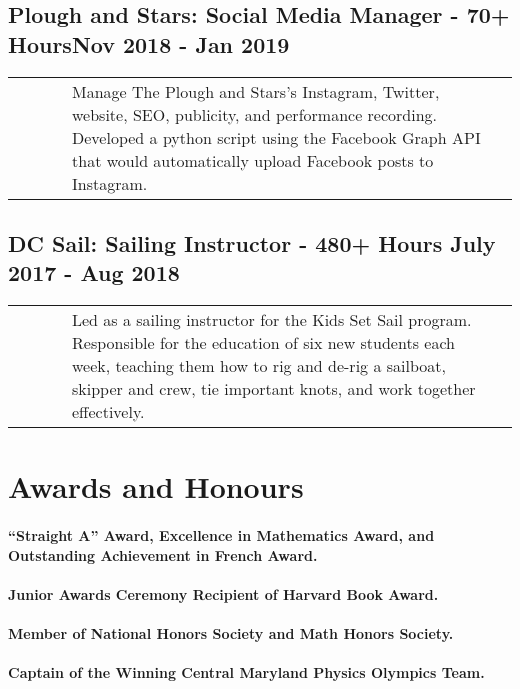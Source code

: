 \documentclass{article}
\begin{document}
\subsection{Plough and Stars: Social Media Manager - 70+ Hours\hfill Nov 2018 - Jan 2019\newline}

\begin{tabularx}{\linewidth}{ @{} l X r @{} }
\ \ \ \ \ & Manage The Plough and Stars’s Instagram, Twitter, website, SEO, publicity, and performance recording. Developed a python script using the Facebook Graph API that would automatically upload Facebook posts to Instagram.
\end{tabularx}

\subsection{DC Sail: Sailing Instructor - 480+ Hours \hfill July 2017 - Aug 2018\newline}

\begin{tabularx}{\linewidth}{ @{} l X r @{} }
\ \ \ \ \ & Led as a sailing instructor for the Kids Set Sail program. Responsible for the education of six new students each week,  teaching them how to rig and de-rig a sailboat,  skipper and crew,  tie important knots, and work together effectively.
\end{tabularx}

\section{Awards and Honours}

\paragraph{“Straight A” Award, Excellence in Mathematics Award, and Outstanding Achievement in French Award.}

\paragraph{Junior Awards Ceremony Recipient of Harvard Book Award.}

\paragraph{Member of National Honors Society and Math Honors Society.}

\paragraph{Captain of the Winning Central Maryland Physics Olympics Team.}
\end{document}
